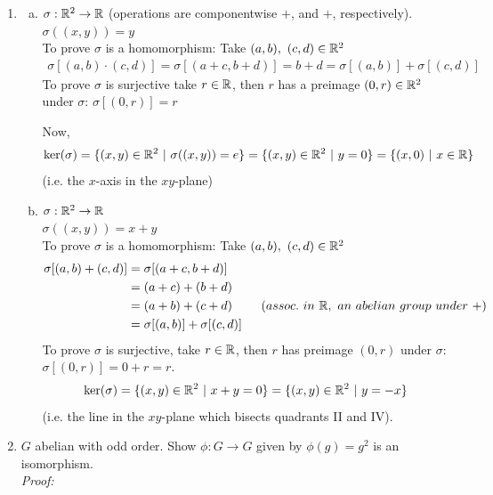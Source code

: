 \begin{enumerate}
    \item \begin{enumerate}[a)]
        \item $\sigma : {\mathbb{ R}}^2 \rightarrow {\mathbb{ R}}$ (operations are componentwise $+$, and $+$, respectively).\\
        $\sigma((x,y))=y$ \\
        To prove $\sigma$ is a homomorphism: Take $(a,b), \ (c,d)\in {\mathbb{ R}}^2$
        \begin{align*}
            \sigma[(a,b)\cdot (c,d)] = \sigma[(a+c,b+d)] = b+d = \sigma[(a,b)]+\sigma[(c,d)]
        \end{align*}
        To prove $\sigma$ is surjective take $r\in {\mathbb{ R}}$, then $r$ has a preimage $(0,r)\in {\mathbb{ R}}^2$ under $\sigma$: $\sigma[(0,r)]=r$

        Now, 
        \begin{align*}
            \text{ker}(\sigma) = \{(x,y) \in {\mathbb{ R}}^2 \ | \ \sigma((x,y))= e\} = \{(x,y)\in {\mathbb{ R}}^2 \ | \ y=0\} = \{(x,0) \ | \ x\in {\mathbb{ R}}\}
        \end{align*}
        (i.e. the $x$-axis in the $xy$-plane)
        \item $\sigma : {\mathbb{ R}}^2 \rightarrow {\mathbb{ R}}$ \\
        $\sigma((x,y))= x+y$ \\
        To prove $\sigma$ is a homomorphism: Take $(a,b), \ (c,d)\in {\mathbb{ R}}^2 $
        \begin{align*}
            \sigma[(a,b)+(c,d)] &= \sigma[(a+c,b+d)] \\
            &= (a+c)+(b+d) \\ 
            &= (a+b) + (c+d) \ \ \ \ \ \ \ (assoc. \ in \ \R, \ an \ abelian \ group \ under \ +) \\
            &= \sigma[(a,b)]+ \sigma[(c,d)]
        \end{align*}
        To prove $\sigma$ is surjective, take $r\in {\mathbb{ R}}$, then $r$ has preimage $(0,r)$ under $\sigma$: $\sigma[(0,r)]=0+r=r$.
        \begin{align*}
            \text{ker}(\sigma) = \{(x,y)\in {\mathbb{ R}}^2 \ | \ x+y=0\} = \{(x,y)\in {\mathbb{ R}}^2 \ | \ y=-x \}
        \end{align*}
        (i.e. the line in the $xy$-plane which bisects quadrants II and IV).
    \end{enumerate}
    \item $G$ abelian with odd order. Show $\phi: G \rightarrow G$ given by $\phi(g)=g^2$ is an isomorphism. \\
    \textit{Proof:} \\

\end{enumerate}

